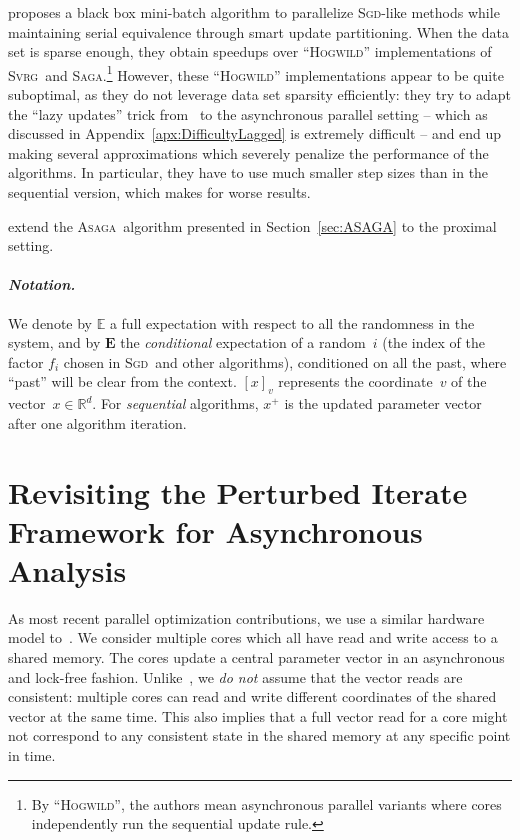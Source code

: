 \documentclass[twoside, 11pt]{article}
\newcommand{\E}{\mathbb{E}}
\newcommand{\Econd}{\mathbf{E}}
\newcommand{\ASAGA}{\textsc{Asaga}}
\newcommand{\SAGA}{\textsc{Saga}}
\newcommand{\SVRG}{\textsc{Svrg}}
\newcommand{\Hogwild}{\textsc{Hogwild}}
\newcommand{\SGD}{\textsc{Sgd}}
\begin{document}
\citet{cyclades} proposes a black box mini-batch algorithm to parallelize \SGD-like methods while maintaining serial equivalence through smart update partitioning.
When the data set is sparse enough, they obtain speedups over ``\Hogwild'' implementations of \SVRG\ and \SAGA.\footnote{By ``\Hogwild'', the authors mean asynchronous parallel variants where cores independently run the sequential update rule.}
However, these ``\Hogwild'' implementations appear to be quite suboptimal, as they do not leverage data set sparsity efficiently: they try to adapt the ``lazy updates'' trick from~\citet{laggedsaga} to the asynchronous parallel setting -- which as discussed in Appendix~\ref{apx:DifficultyLagged} is extremely difficult -- and end up making several approximations which severely penalize the performance of the algorithms.
In particular, they have to use much smaller step sizes than in the sequential version, which makes for worse results.

\citet{pedregosa2017maga} extend the \ASAGA\ algorithm presented in Section~\ref{sec:ASAGA} to the proximal setting.


\paragraph{\textit{Notation.}}
We denote by $\E$ a full expectation with respect to all the randomness in the system, and by $\Econd$ the \emph{conditional} expectation of a random~$i$ (the index of the factor $f_i$ chosen in \SGD\ and other algorithms), conditioned on all the past, where ``past'' will be clear from the context.
$[x]_v$ represents the coordinate~$v$ of the vector~$x \in \mathbb{R}^d$.
For \textit{sequential} algorithms, $x^+$ is the updated parameter vector after one algorithm iteration.

\section{Revisiting the Perturbed Iterate Framework for Asynchronous Analysis}\label{pif}
As most recent parallel optimization contributions, we use a similar hardware model to~\citet{hogwild}.
We consider multiple cores which all have read and write access to a shared memory.
The cores update a central parameter vector in an asynchronous and lock-free fashion.
Unlike~\citet{hogwild}, we \emph{do not} assume that the vector reads are consistent: multiple cores can read and write different coordinates of the shared vector at the same time. This also implies that a full vector read for a core might not correspond to any consistent state in the shared memory at any specific point in time.
\end{document}
